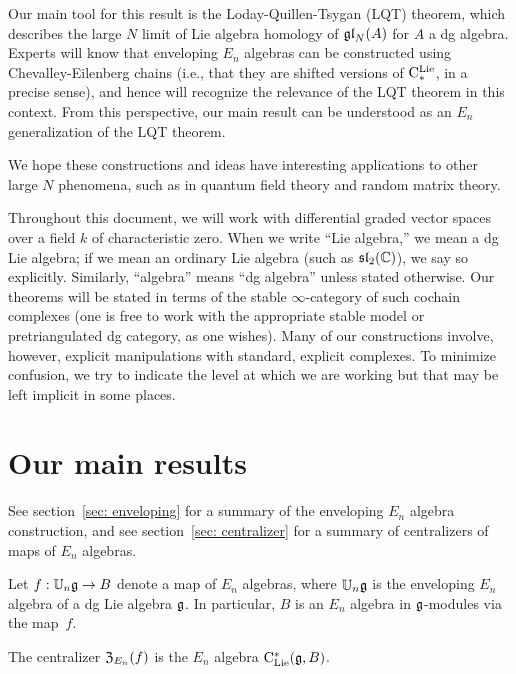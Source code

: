 \documentclass[11pt]{amsart}
\numberwithin{equation}{section}
\begin{document}
Our main tool for this result is the Loday-Quillen-Tsygan (LQT) theorem,
which describes the large $N$ limit of Lie algebra homology of $\frak{gl}_N(A)$ for $A$ a dg algebra.
Experts will know that enveloping $E_n$ algebras can be constructed using Chevalley-Eilenberg chains
(i.e., that they are shifted versions of ${\rm C}^{\rm Lie}_*$, in a precise sense),
and hence will recognize the relevance of the LQT theorem in this context.
From this perspective, our main result can be understood as an $E_n$ generalization of the LQT theorem.

We hope these constructions and ideas have interesting applications to other large $N$ phenomena,
such as in quantum field theory and random matrix theory.

\begin{rmk}
Throughout this document, we will work with differential graded vector spaces over a field $k$ of characteristic zero.
When we write ``Lie algebra,'' we mean a dg Lie algebra; if we mean an ordinary Lie algebra (such as $\frak{sl}_2(\mathbb C)$), we say so explicitly.
Similarly, ``algebra'' means ``dg algebra'' unless stated otherwise.
Our theorems will be stated in terms of the stable $\infty$-category of such cochain complexes (one is free to work with the appropriate stable model or pretriangulated dg category, as one wishes).
Many of our constructions involve, however, explicit manipulations with standard, explicit complexes.
To minimize confusion, we try to indicate the level at which we are working but that may be left implicit in some places.
\end{rmk}

\section{Our main results}

See section~\ref{sec: enveloping} for a summary of the enveloping $E_n$ algebra construction, 
and see section~\ref{sec: centralizer} for a summary of centralizers of maps of $E_n$ algebras.

\begin{thm}
\label{thm: centralizer}
Let $f: \mathbb U_n \mathfrak g \to B$ denote a map of $E_n$ algebras, where $\mathbb U_n \mathfrak g$ is the enveloping $E_n$ algebra of a dg Lie algebra $\mathfrak g$.
In particular, $B$ is an $E_n$ algebra in $\mathfrak g$-modules via the map~$f$.

The centralizer ${\frak Z}_{E_n}(f)$ is the $E_n$ algebra ${\rm C}_{\rm Lie}^*(\mathfrak g, B)$.
\end{thm}
\end{document}

